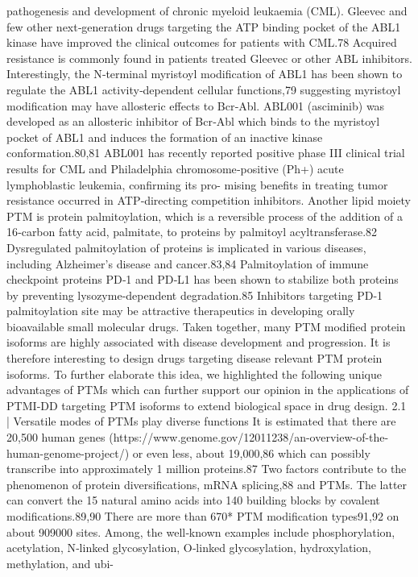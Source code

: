 pathogenesis and development of chronic myeloid leukaemia (CML). Gleevec and few other next‐generation drugs
targeting the ATP binding pocket of the ABL1 kinase have improved the clinical outcomes for patients with CML.78
Acquired resistance is commonly found in patients treated Gleevec or other ABL inhibitors. Interestingly, the
N‐terminal myristoyl modification of ABL1 has been shown to regulate the ABL1 activity‐dependent cellular
functions,79 suggesting myristoyl modification may have allosteric effects to Bcr‐Abl. ABL001 (asciminib) was
developed as an allosteric inhibitor of Bcr‐Abl which binds to the myristoyl pocket of ABL1 and induces the
formation of an inactive kinase conformation.80,81 ABL001 has recently reported positive phase III clinical trial
results for CML and Philadelphia chromosome‐positive (Ph+) acute lymphoblastic leukemia, confirming its pro-
mising benefits in treating tumor resistance occurred in ATP‐directing competition inhibitors. Another lipid moiety
PTM is protein palmitoylation, which is a reversible process of the addition of a 16‐carbon fatty acid, palmitate, to
proteins by palmitoyl acyltransferase.82 Dysregulated palmitoylation of proteins is implicated in various diseases,
including Alzheimer's disease and cancer.83,84 Palmitoylation of immune checkpoint proteins PD‐1 and PD‐L1 has
been shown to stabilize both proteins by preventing lysozyme‐dependent degradation.85 Inhibitors targeting PD‐1
palmitoylation site may be attractive therapeutics in developing orally bioavailable small molecular drugs. Taken
together, many PTM modified protein isoforms are highly associated with disease development and progression. It
is therefore interesting to design drugs targeting disease relevant PTM protein isoforms. To further elaborate this
idea, we highlighted the following unique advantages of PTMs which can further support our opinion in the
applications of PTMI‐DD targeting PTM isoforms to extend biological space in drug design.
2.1
|
Versatile modes of PTMs play diverse functions
It is estimated that there are 20,500 human genes (https://www.genome.gov/12011238/an-overview-of-the-
human-genome-project/) or even less, about 19,000,86 which can possibly transcribe into approximately 1 million
proteins.87 Two factors contribute to the phenomenon of protein diversifications, mRNA splicing,88 and PTMs. The
latter can convert the 15 natural amino acids into 140 building blocks by covalent modifications.89,90 There are
more than 670* PTM modification types91,92 on about 909000 sites. Among, the well‐known examples include
phosphorylation, acetylation, N‐linked glycosylation, O‐linked glycosylation, hydroxylation, methylation, and ubi-
